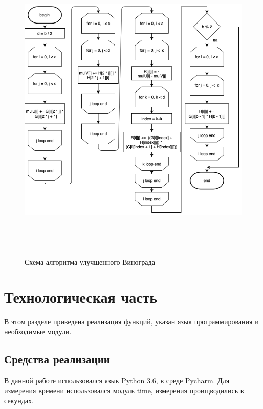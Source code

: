\documentclass[12pt]{article}
\begin{document}
\newpage
\begin{figure}[ht!]
	\centering
	\includegraphics[width=150mm, height=150mm]{opt-2.png}
	\caption{Схема алгоритма улучшенного Винограда \label{overflow}}
\end{figure}
\newpage
\section{Технологическая часть}

В этом разделе приведена реализация функций, указан язык программирования и необходимые модули. 
\subsection{Средства реализации}
В данной работе использовался язык Python 3.6, в среде Pycharm. Для измерения времени использовался модуль time, измерения проищводились в секундах.
\end{document}
